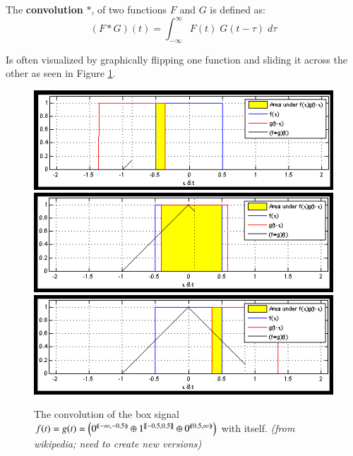 
\begin{definition}
	The \textbf{convolution} $*$, of two functions $F$ and $G$ is defined as:
	\begin{equation}
		(F*G)(t) = \int_{-\infty}^\infty F(t) \;G(t - \tau) \; d\tau
	\end{equation}
\end{definition}

Is often visualized by graphically flipping one function and sliding it across the other as seen in Figure \ref{convolution}.

\begin{figure}[h]
\label{convolution}
\caption[Convolution of box signal with itself]{The convolution of the box signal 
$f(t)=g(t)=\left( 0^{ (\!( -\infty,-0.5 )\!) } \oplus 1^{ [\![ -0.5,0.5 ]\!] } \oplus 0^{ (\!( 0.5,\infty )\!) } \right)$ with itself.
\emph{(from wikipedia; need to create new versions)}}
\centering
\includegraphics[scale=0.6]{diagrams/conv1}
\includegraphics[scale=0.6]{diagrams/conv2}
\includegraphics[scale=0.6]{diagrams/conv3}
\end{figure}

